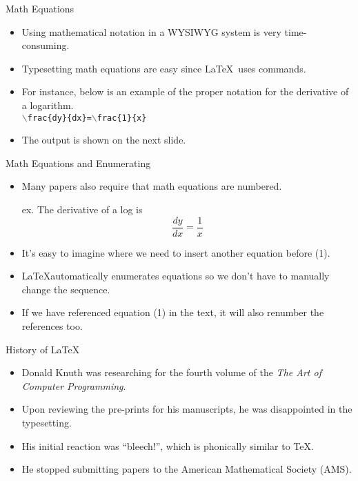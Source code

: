 \documentclass[pdf]{prosper}
\begin{document}
\begin{slide}{Math Equations}
	\begin{itemize}
		\item Using mathematical notation in a WYSIWYG system is very time-consuming.
		\item Typesetting math equations are easy since \LaTeX\ uses commands.
		\item For instance, below is an example of the proper notation for the derivative of a logarithm.\\
		\texttt{$\backslash$frac\{dy\}\{dx\}=$\backslash$frac\{1\}\{x\}}\\
		\item The output is shown on the next slide.		
	\end{itemize}
\end{slide}
\begin{slide}{Math Equations and Enumerating}
	\begin{itemize}
		\item Many papers also require that math equations are numbered.
\begin{center}
ex. The derivative of a log is\\
\begin{equation}
	\frac{dy}{dx}=\frac{1}{x}
\end{equation}
\end{center}
		\item It's easy to imagine where we need to insert another equation before (1).
		\item \LaTeX automatically enumerates equations so we don't have to manually change the sequence.
		\item If we have referenced equation (1) in the text, it will also renumber the references too.
	\end{itemize}
\end{slide}
\begin{slide}{History of \LaTeX}
	\begin{itemize}
		\item Donald Knuth was researching for the fourth volume of the \textit{The Art of Computer Programming}.
		\item Upon reviewing the pre-prints for his manuscripts, he was disappointed in the typesetting.
		\item His initial reaction was ``bleech!'', which is phonically similar to \TeX.
		\item He stopped submitting papers to the American Mathematical Society (AMS).
	\end{itemize}
\end{slide}
\end{document}
